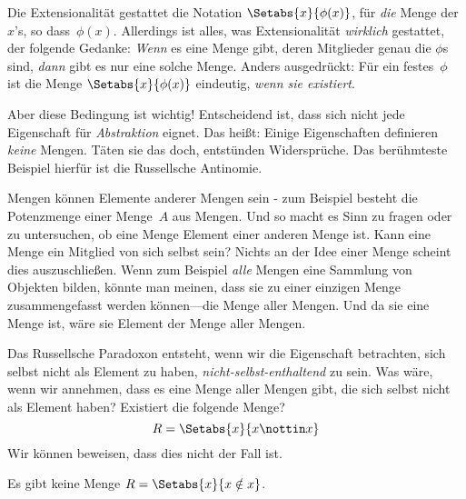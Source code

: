 \documentclass[../../../include/open-logic-section]{subfiles}
\begin{document}

Die Extensionalität gestattet die Notation $\Setabs{x}{\phi(x)}$, für
\emph{die} Menge der $x$'s, so dass~$\phi(x)$. Allerdings ist alles, was
Extensionalität \emph{wirklich} gestattet, der folgende Gedanke:
\emph{Wenn} es eine Menge gibt, deren Mitglieder genau die $\phi$s sind,
\emph{dann} gibt es nur eine solche Menge. Anders ausgedrückt: Für ein festes~$\phi$
ist die Menge $\Setabs{x}{\phi(x)}$ eindeutig, \emph{wenn sie
existiert}.

Aber diese Bedingung ist wichtig!{} Entscheidend ist, dass sich nicht jede Eigenschaft
für \emph{Abstraktion} eignet. Das heißt: Einige Eigenschaften definieren \emph{keine} Mengen.
Täten sie das doch, entstünden Widersprüche. Das berühmteste Beispiel hierfür ist die Russellsche
Antinomie.

Mengen können Elemente anderer Mengen sein - zum Beispiel besteht die Potenzmenge
einer Menge~$A$ aus Mengen. Und so macht es Sinn zu fragen oder
zu untersuchen, ob eine Menge Element einer anderen Menge ist. Kann eine Menge
ein Mitglied von sich selbst sein? Nichts an der Idee einer Menge scheint dies auszuschließen.
Wenn zum Beispiel \emph{alle} Mengen eine Sammlung von
Objekten bilden, könnte man meinen, dass sie zu einer einzigen Menge
zusammengefasst werden können---die Menge aller Mengen. 
Und da sie eine Menge ist, wäre sie Element der Menge aller Mengen. 

Das Russellsche Paradoxon entsteht, wenn wir die Eigenschaft betrachten,
sich selbst nicht als Element zu haben, \emph{nicht-selbst-enthaltend} zu sein.
Was wäre, wenn wir annehmen,
dass es eine Menge aller Mengen gibt, die sich selbst nicht als
Element haben? Existiert die folgende Menge?
\[
R = \Setabs{x}{x \nottin x}
\]
 Wir können beweisen, dass dies nicht der Fall ist.

\begin{thm}
	Es gibt keine Menge $R = \Setabs{x}{x \notin x}$.
\end{thm}
\end{document}
